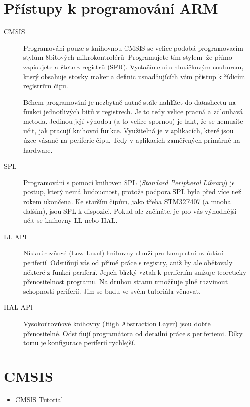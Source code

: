 \section{Přístupy k programování ARM}
\begin{description}
  \item[CMSIS] Programování pouze s knihovnou CMSIS se velice podobá programovacím stylům 
    8bitových mikrokontrolérů. Programujete tím stylem, že přímo zapisujete a čtete z registrů 
    (SFR). Vystačíme si s hlavičkovým souborem, který obsahuje stovky maker a definic    
    usnadňujících vám přístup k řídicím registrům čipu.
  
    Během programování je nezbytně nutné stále nahlížet do datasheetu na funkci jednotlivých bitů v 
    registrech. Je to tedy velice pracná a zdlouhavá metoda. Jedinou její výhodou (a to velice 
    spornou) je fakt, že se nemusíte učit, jak pracují knihovní funkce. Využitelná je v aplikacích, 
    které jsou úzce vázané na periferie čipu. Tedy v aplikacích zaměřených primárně na hardware.
  \item[SPL] Programování s pomocí knihoven SPL (\emph{Standard Peripheral Library}) je postup, 
    který nemá budoucnost, protože podpora SPL byla před více než rokem ukončena. Ke starším čipům, 
    jako třeba STM32F407 (a mnoha dalším), jsou SPL k dispozici. Pokud ale začínáte, je pro vás 
    výhodnější učit se knihovny LL nebo HAL.
  \item [LL API] Nízkoúrovňové (Low Level) knihovny slouží pro kompletní ovládání periferií. 
    Odstiňují vás od přímé práce s registry, aniž by ale obětovaly některé z funkcí periferií. 
    Jejich blízký vztah k periferiím snižuje teoreticky přenositelnost programu. Na druhou stranu 
    umožňuje plně rozvinout schopnosti periferií. Jim se budu ve svém tutoriálu věnovat.
  \item [HAL API] Vysokoúrovňové knihovny (High Abstraction Layer) jsou dobře přenositelné. 
    Odstiňují programátora od detailní práce s periferiemi. Díky tomu je konfigurace periferií 
    rychlejší. 
\end{description}


\section{CMSIS}
  \begin{itemize}
    \item \href{http://librarian/stable.php?id=141}{CMSIS Tutorial}
  \end{itemize}
  
